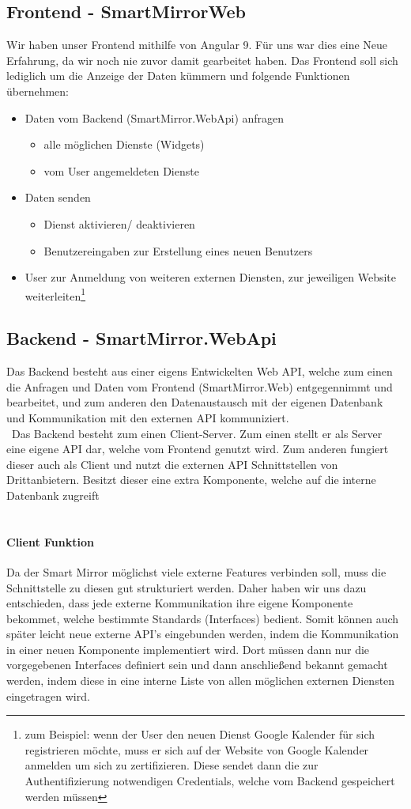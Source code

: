 \documentclass[a4paper,11pt]{article}
\begin{document}
\subsection{Frontend - SmartMirrorWeb}
Wir haben unser Frontend mithilfe von Angular 9. Für uns war dies eine Neue Erfahrung, da wir noch nie zuvor damit gearbeitet haben. Das Frontend soll sich lediglich um die Anzeige der Daten kümmern und folgende Funktionen übernehmen:
\begin{itemize}
\item Daten vom Backend (SmartMirror.WebApi) anfragen
\begin{itemize}
\item alle möglichen Dienste (Widgets)
\item vom User angemeldeten Dienste
\end{itemize}
\item Daten senden
\begin{itemize}
\item Dienst aktivieren/ deaktivieren
\item Benutzereingaben zur Erstellung eines neuen Benutzers
\end{itemize}
\item User zur Anmeldung von weiteren externen Diensten, zur jeweiligen Website weiterleiten\footnote{zum Beispiel: wenn der User den neuen Dienst Google Kalender für sich registrieren möchte, muss er sich auf der Website von Google Kalender anmelden um sich zu zertifizieren. Diese sendet dann die zur Authentifizierung notwendigen Credentials, welche vom Backend gespeichert werden müssen }
\end{itemize} 
\subsection{Backend - SmartMirror.WebApi}
Das Backend besteht aus einer eigens Entwickelten Web API, welche zum einen die Anfragen und Daten vom Frontend (SmartMirror.Web) entgegennimmt und bearbeitet, und zum anderen den Datenaustausch mit der eigenen Datenbank und Kommunikation mit den externen API kommuniziert.\\\
Das Backend besteht zum einen Client-Server. Zum einen stellt er als Server eine eigene API dar, welche vom Frontend genutzt wird. Zum anderen fungiert dieser auch als Client und nutzt die externen API Schnittstellen von Drittanbietern. Besitzt dieser eine extra Komponente, welche auf die interne Datenbank zugreift\\\
\paragraph{Client Funktion}
Da der Smart Mirror möglichst viele externe Features verbinden soll, muss die Schnittstelle zu diesen gut strukturiert werden. Daher haben wir uns dazu entschieden, dass jede externe Kommunikation ihre eigene Komponente bekommet, welche bestimmte Standards (Interfaces) bedient. Somit können auch später leicht neue externe API's eingebunden werden, indem die Kommunikation in einer neuen Komponente implementiert wird. Dort müssen dann nur die vorgegebenen Interfaces definiert sein und dann anschließend bekannt gemacht werden, indem diese in eine interne Liste von allen möglichen externen Diensten eingetragen wird.
\end{document}
